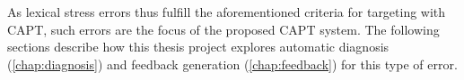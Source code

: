 
	\vspace{2em}


	As lexical stress errors thus fulfill the aforementioned criteria for targeting with CAPT, such errors are the focus of the proposed CAPT system. The following sections describe how this thesis project explores automatic diagnosis (\cref{chap:diagnosis}) and feedback generation (\cref{chap:feedback}) for this type of error.		
		

	

